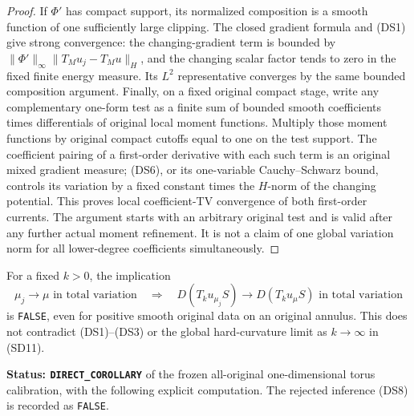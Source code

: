 \begin{proof}
If $\Phi'$ has compact support, its normalized composition is
a smooth function of one sufficiently large clipping.  The
closed gradient formula and (DS1) give strong convergence:
the changing-gradient term is bounded by
$\|\Phi'\|_\infty\|T_Mu_j-T_Mu\|_H$, and the
changing scalar factor tends to zero in the fixed finite
energy measure.  Its $L^2$ representative converges by the
same bounded composition argument.  Finally, on a fixed
original compact stage, write any complementary one-form
test as a finite sum of bounded smooth coefficients times
differentials of original local moment functions.  Multiply
those moment functions by original compact cutoffs equal to
one on the test support.  The coefficient pairing of a
first-order derivative with each such term is an original
mixed gradient measure; (DS6), or its one-variable
Cauchy--Schwarz bound, controls its variation by a fixed
constant times the $H$-norm of the changing potential.
This proves local coefficient-TV convergence of both first-order
currents.  The argument starts with an arbitrary original test
and is valid after any further actual moment refinement.
It is not a claim of one global variation norm for all
lower-degree coefficients simultaneously.
\end{proof}

\begin{proposition}
\label{prop:r11-hard-clipping-source-TV-failure}
For a fixed $k>0$, the implication
\[
 \mu_j\longrightarrow\mu\text{ in total variation}
 \quad\Longrightarrow\quad
 D(T_ku_{\mu_j}S)\longrightarrow D(T_ku_\mu S)
                   \text{ in total variation}
 \tag{DS8}
\]
is \texttt{FALSE}, even for positive smooth original data on an
original annulus.  This does not contradict (DS1)--(DS3) or
the global hard-curvature limit as $k\to\infty$ in (SD11).
\end{proposition}

\noindent\textbf{Status: \texttt{DIRECT\_COROLLARY}} of the
frozen all-original one-dimensional torus calibration, with the
following explicit computation.  The rejected inference (DS8)
is recorded as \texttt{FALSE}.

